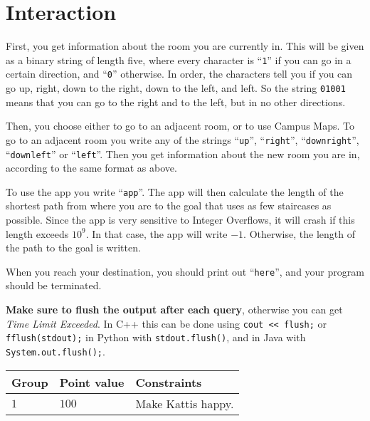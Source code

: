 

\section*{Interaction}
First, you get information about the room you are currently in. 
This will be given as a binary string of length five, where every character is ``\texttt{1}'' if you can go in a certain direction, and ``\texttt{0}'' otherwise.
In order, the characters tell you if you can go up, right, down to the right, down to the left, and left.
So the string \texttt{01001} means that you can go to the right and to the left, but in no other directions.

Then, you choose either to go to an adjacent room, or to use Campus Maps.
To go to an adjacent room you write any of the strings 
``\texttt{up}'', ``\texttt{right}'', ``\texttt{downright}'', ``\texttt{downleft}'' or ``\texttt{left}''.
Then you get information about the new room you are in, according to the same format as above.

To use the app you write ``\texttt{app}''.
The app will then calculate the length of the shortest path from where you are to the goal that uses as few staircases as possible.
Since the app is very sensitive to Integer Overflows, it will crash if this length exceeds $10^9$.
In that case, the app will write $-1$.
Otherwise, the length of the path to the goal is written.

When you reach your destination, you should print out ``\texttt{here}'', and your program should be terminated.


\textbf{Make sure to flush the output after each query}, otherwise you can get \textit{Time Limit Exceeded}.
In C++ this can be done using \texttt{cout << flush;}
or \texttt{fflush(stdout);}
in Python with \texttt{stdout.flush()},
and in Java with \texttt{System.out.flush();}.




\noindent
\begin{tabular}{| l | l | l |}
  \hline
  \textbf{Group} & \textbf{Point value} & \textbf{Constraints} \\ \hline
  $1$   & $100$        & Make Kattis happy. \\ \hline
\end{tabular}

